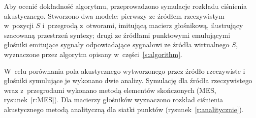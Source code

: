 \documentclass[12pt]{oska}
\begin{document}
Aby ocenić dokładność algorytmu, przeprowadzono symulacje rozkładu ciśnienia
akustycznego.  Stworzono dwa modele: pierwszy ze źródłem rzeczywistym w~pozycji
$S$ i~przegrodą z~otworami, imitującą macierz głośnikową, ilustrujący szacowaną
przestrzeń syntezy; drugi ze źródłami punktowymi emulującymi głośniki
emitujące sygnały odpowiadające sygnałowi ze źródła wirtualnego $S$, wyznaczone przez algorytm opisany w~części~\ref{s:algorithm}.

W~celu porównania pola
akustycznego wytworzonego przez źródło rzeczywiste i głośniki symulujące je wykonano dwie analizy. Symulację dla źródła rzeczywistego wraz z~przegrodami wykonano metodą elementów skończonych (MES, rysunek~\ref{r:MES}). Dla macierzy głośników wyznaczono rozkład ciśnienia akustycznego metodą analityczną dla siatki punktów (rysunek~\ref{r:analitycznie}).
\end{document}
